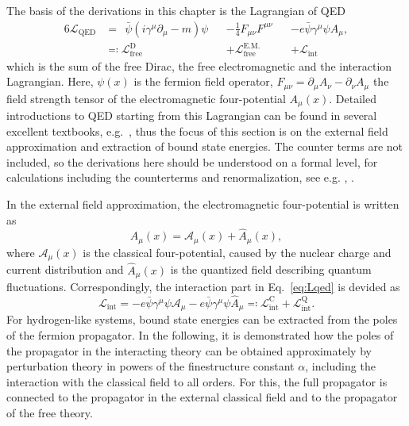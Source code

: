 The basis of the derivations in this chapter is the Lagrangian of QED
\begin{alignat}{6}
\label{eq:Lqed}
\mathcal{L}_{\text{QED}}&=\phantom{:}\bar{\psi}\left( i \gamma^\mu \partial_\mu -m  \right)\psi &&-\frac{1}{4}F_{\mu\nu}F^{\mu\nu}&&-e\bar{\psi}\gamma^\mu \psi A_\mu,\\
&\eqqcolon \mathcal{L}_{\text{free}}^{\text{D}} &&+ \mathcal{L}_{\text{free}}^{\text{E.M.}} &&+ \mathcal{L}_{\text{int}} \nonumber
\end{alignat}
which is the sum of the free Dirac, the free electromagnetic and the interaction Lagrangian. Here, $\psi(x)$ is the fermion field operator, $F_{\mu\nu}=\partial_\mu A_\nu - \partial_\nu A_\mu$ the field strength tensor of the electromagnetic four-potential $A_\mu(x)$. Detailed introductions to QED starting from this Lagrangian can be found in several excellent textbooks, e.g.~\cite{weinberg2005,itzykson2005,peskin1995}, thus the focus of this section is on the external field approximation and extraction of bound state energies. The counter terms are not included, so the derivations here should be understood on a formal level, for calculations including the counterterms and renormalization, see e.g. \cite[Section 14]{weinberg2005}, \cite{shabaev2002_2}.

In the external field approximation, the electromagnetic four-potential is written as
\begin{equation}
A_\mu(x) = \mathcal{A}_\mu(x) + \hat{A}_\mu(x),
\end{equation}
where $\mathcal{A}_\mu(x)$ is the classical four-potential, caused by the nuclear charge and current distribution and $\hat{A}_\mu(x)$ is the quantized field describing quantum fluctuations. Correspondingly, the interaction part in Eq.~\eqref{eq:Lqed} is devided as
\begin{equation}
\label{eq:Lint}
\mathcal{L}_{\text{int}}=-e\bar{\psi}\gamma^\mu \psi \mathcal{A}_\mu-e\bar{\psi}\gamma^\mu \psi \hat{A}_\mu\eqqcolon\mathcal{L}_{\text{int}}^{\text{C}} + \mathcal{L}_{\text{int}}^{\text{Q}}.
\end{equation}
For hydrogen-like systems, bound state energies can be extracted from the poles of the fermion propagator. In the following, it is demonstrated how the poles of the propagator in the interacting theory can be obtained approximately by perturbation theory in powers of the finestructure constant $\alpha$, including the interaction with the classical field to all orders. For this, the full propagator is connected to the propagator in the external classical field and to the propagator of the free theory.
